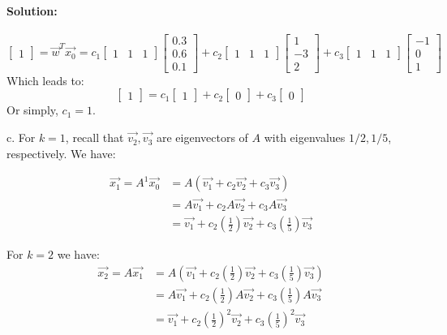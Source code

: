 \documentclass[12pt, letterpaper]{article}
\theoremstyle{statement}
\theoremstyle{statement}
\newenvironment{Solution}{\noindent\ignorespaces\paragraph{Solution:}}{\hfill \ding{122}\par\noindent}
\begin{document}
\begin{Solution}
    $$
    \begin{bmatrix} 1 \end{bmatrix}
    = \vec{w}^T\vec{x_0}
    = c_1 
    \begin{bmatrix} 1 & 1 & 1 \end{bmatrix}
    \begin{bmatrix} 0.3 \\ 0.6 \\ 0.1 \end{bmatrix} + c_2 \begin{bmatrix} 1 & 1 & 1 \end{bmatrix} \begin{bmatrix} 1 \\ -3 \\ 2 \end{bmatrix} + c_3 \begin{bmatrix} 1 & 1 & 1 \end{bmatrix} \begin{bmatrix} -1 \\ 0 \\ 1 \end{bmatrix}
    $$
    Which leads to:
    $$
    \begin{bmatrix} 1 \end{bmatrix}
    =
    c_1 \begin{bmatrix} 1 \end{bmatrix} + c_2\begin{bmatrix} 0 \end{bmatrix} + c_3 \begin{bmatrix} 0 \end{bmatrix}
    $$
    Or simply, $c_1 = 1$.
    
    c. For $k=1$, recall that $\vec{v_2}, \vec{v_3}$ are eigenvectors of $A$ with eigenvalues $1/2, 1/5$, respectively. We have:
    
    \begin{align*}
        \vec{x_1} = A^1\vec{x_0} &= A(\vec{v_1} + c_2\vec{v_2} + c_3\vec{v_3}) \\
        &= A\vec{v_1} + c_2A\vec{v_2} + c_3A\vec{v_3} \\
        &= \vec{v_1} + c_2\left(\frac{1}{2}\right)\vec{v_2} + c_3\left(\frac{1}{5}\right)\vec{v_3}
    \end{align*} 
    
    For $k=2$ we have:
    \begin{align*}
        \vec{x_2} = A\vec{x_1} &= A(\vec{v_1} + c_2\left(\frac{1}{2}\right)\vec{v_2} + c_3\left(\frac{1}{5}\right)\vec{v_3}) \\
        &= A\vec{v_1} + c_2\left(\frac{1}{2}\right)A\vec{v_2} + c_3\left(\frac{1}{5}\right)A\vec{v_3} \\
        &= \vec{v_1} + c_2\left(\frac{1}{2}\right)^2\vec{v_2} + c_3\left(\frac{1}{5}\right)^2\vec{v_3}
    \end{align*} 
    

\end{Solution}
\end{document}
